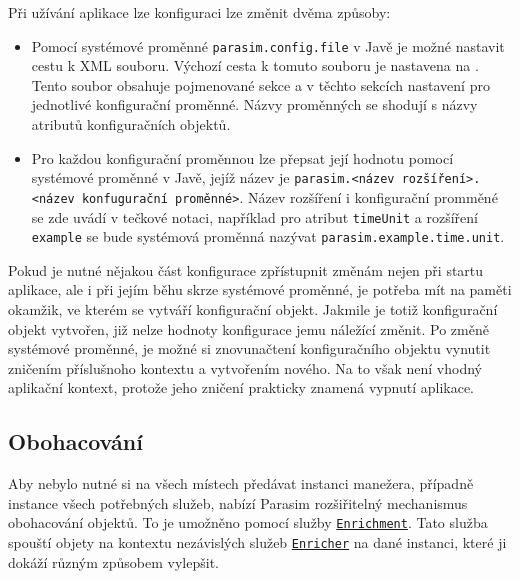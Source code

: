 Při užívání aplikace lze konfiguraci lze změnit dvěma způsoby:

\begin{itemize}
	\item	Pomocí systémové proměnné \texttt{parasim.config.file} v Javě je mož\-né nastavit cestu k XML souboru.
			Výchozí cesta k tomuto souboru je nastavena na . Tento soubor
			obsahuje pojmenované sekce a v těchto sekcích nastavení pro jednotlivé konfigurační
			pro\-měn\-né. Názvy proměnných se shodují s názvy atributů konfiguračních objektů.

	\item	Pro každou konfigurační proměnnou lze přepsat její hodnotu pomocí systémové
			proměnné v Javě, jejíž název je \texttt{parasim.<název roz\-ší\-ření>.<název konfugurační proměnné>}.
			Název rozšíření i konfigurační promměné se zde uvádí v tečkové notaci, například pro atribut \texttt{timeUnit}
			a rozšíření \texttt{example} se bude systémová proměnná nazývat \texttt{parasim.example.time.unit}.
\end{itemize}

Pokud je nutné nějakou část konfigurace zpřístupnit
změnám nejen při startu aplikace, ale i při jejím běhu skrze systémové proměnné, je potřeba mít na paměti
okamžik, ve kterém se vytváří konfigurační objekt. Jakmile je totiž konfigurační objekt vytvořen,
již nelze hodnoty konfigurace jemu náležící změnit. Po změně systémové proměnné,
je možné si znovunačtení konfiguračního objektu vynutit zničením příslušnoho kontextu
a vy\-tvo\-ře\-ním nového. Na to však není vhodný aplikační kontext, protože jeho
zničení prakticky znamená vypnutí aplikace.

\subsection{Obohacování}\label{section:enrichment}

Aby nebylo nutné si na všech místech předávat instanci manežera, případně instance všech
potřebných služeb, nabízí Parasim rozšiřitelný mechanismus obohacování objektů.
To je umožněno pomocí služby \href{https://github.com/sybila/parasim/blob/master/core/src/main/java/org/sybila/parasim/core/api/enrichment/Enrichment.java}{\texttt{Enrichment}}.
Tato služba spouští objety na kontextu nezávislých služeb \href{https://github.com/sybila/parasim/blob/master/core/src/main/java/org/sybila/parasim/core/spi/enrichment/Enricher.java}{\texttt{Enricher}}
na dané instanci, které ji dokáží různým způsobem vylepšit. 

